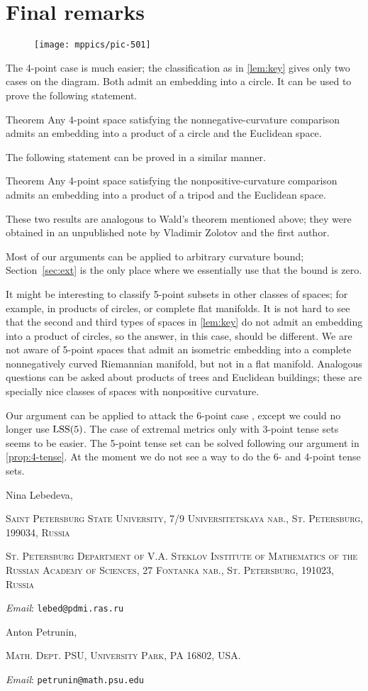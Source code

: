 \documentclass{article}
\makeatletter
\newcommand{\Addresses}{{\bigskip\footnotesize

\noindent Nina Lebedeva,
\par\nopagebreak
 \textsc{Saint Petersburg State University, 7/9 Universitetskaya nab., St. Petersburg, 199034, Russia}
\par
\nopagebreak
 \textsc{St. Petersburg Department of V.A. Steklov Institute of Mathematics of the Russian Academy of Sciences, 27 Fontanka nab., St. Petersburg, 191023, Russia}
  \par\nopagebreak
  \textit{Email}: \texttt{lebed@pdmi.ras.ru}

\medskip

\noindent   Anton Petrunin, 
\par\nopagebreak
 \textsc{Math. Dept. PSU, University Park, PA 16802, USA.}
  \par\nopagebreak
  \textit{Email}: \texttt{petrunin@math.psu.edu}
  
}}
\makeatother
\begin{document}
\pagebreak

\section{Final remarks}

{

\begin{wrapfigure}{r}{30mm}
\vskip-6mm
\centering
\texttt{[image: mppics/pic-501]}
\end{wrapfigure}

The 4-point case is much easier;
the classification as in \ref{lem:key} gives only two cases on the diagram.
Both admit an embedding into a circle.
It can be used to prove the following statement.

}

\begin{thm}{Theorem}
Any 4-point space satisfying the nonnegative-curvature comparison
admits an embedding into a product of a circle and the Euclidean space.
\end{thm}

The following statement can be proved in a similar manner.

\begin{thm}{Theorem} Any 4-point space satisfying the nonpositive-curvature comparison admits an embedding into a product of a tripod and the Euclidean space.
\end{thm}

These two results are analogous to Wald's theorem mentioned above;
they were obtained in an unpublished note by Vladimir Zolotov and the first author.

\medskip

Most of our arguments can be applied to arbitrary curvature bound;
Section~\ref{sec:ext} is the only place where we essentially use that the bound is zero.

It might be interesting to classify 5-point subsets in other classes of spaces;
for example, in products of circles, or complete flat manifolds.
It is not hard to see that the second and third types of spaces in \ref{lem:key} do not admit an embedding into a product of circles, so the answer, in this case, should be different.
We are not aware of 5-point spaces that admit an isometric embedding into a complete nonnegatively curved Riemannian manifold, but not in a flat manifold.
Analogous questions can be asked about products of trees and Euclidean buildings;
these are specially nice classes of spaces with nonpositive curvature.

Our argument can be applied to attack the 6-point case \cite[Question~6.3]{lebedeva-petrunin}, except we could no longer use $\mathrm{LSS}(5)$.
The case of extremal metrics only with 3-point tense sets seems to be easier. 
The 5-point tense set can be solved following our argument in \ref{prop:4-tense}.
At the moment we do not see a way to do the 6- and 4-point tense sets.

{\sloppy
\printbibliography[heading=bibintoc]
\fussy
}

\Addresses
\end{document}

